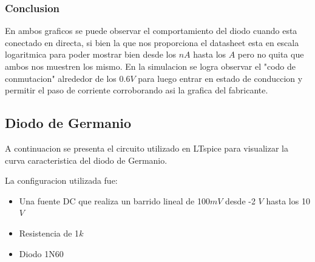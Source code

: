\documentclass[chaptersright]{informeutn}
\begin{document}
                \subsubsection{Conclusion}
    
                    En ambos graficos se puede observar el comportamiento del diodo cuando esta conectado en directa, si bien la que nos proporciona el datasheet esta en escala logaritmica para poder mostrar bien desde los $nA$ hasta los $A$ pero no quita que ambos nos muestren los mismo. En la simulacion se logra observar el "codo de conmutacion" alrededor de los 0.6$V$ para luego entrar en estado de conduccion y permitir el paso de corriente corroborando asi la grafica del fabricante.
    
                \newpage
                
            \subsection{Diodo de Germanio}
            
                A continuacion se presenta el circuito utilizado en LTspice para visualizar la curva caracteristica del diodo de Germanio.
    
    
                La configuracion utilizada fue:
                \begin{itemize}
                    \item Una fuente DC que realiza un barrido lineal de 100$mV$ desde -2 $V$ hasta los 10 $V$ 
                    \item Resistencia de 1$k$
                    \item Diodo 1N60
                \end{itemize}
            
\end{document}
